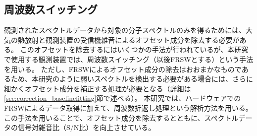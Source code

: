 \subsection{周波数スイッチング}
\label{subsec:frsw}
観測されたスペクトルデータから対象の分子スペクトルのみを得るためには、大気の熱放射と観測装置の受信機雑音によるオフセット成分を除去する必要がある。
このオフセットを除去するにはいくつかの手法が行われているが、本研究で使用する観測装置では、周波数スイッチング（以後FRSWとする）という手法を用いる。
ただし、FRSWによるオフセット成分の除去はおおまかなものであるため、本研究のように弱いスペクトルを検出する必要がある場合には、さらに細かくオフセット成分を補正する処理が必要となる（詳細は\ref{sec:correction_baselinefitting}節で述べる）。
本研究では、ハードウェアでのFRSWによるデータ取得に加えて、周波数折返し処理という解析方法を用いる。
この手法を用いることで、オフセット成分を除去するとともに、スペクトルデータの信号対雑音比（S/N比）を向上させている。\par


